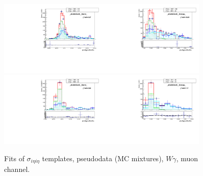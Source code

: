 \begin{figure}[htb]
\begin{center}
   \includegraphics[width=0.45\textwidth]{../figs/figs_v11/MUON_WGamma/TemplateFits/c_TEMPL_SIHIH_UNblind__phoEt25to30__Barrel__RooFit_MCclosure.pdf}\includegraphics[width=0.45\textwidth]{../figs/figs_v11/MUON_WGamma/TemplateFits/c_TEMPL_SIHIH_UNblind__phoEt25to30__Endcap__RooFit_MCclosure.pdf}\\
   \includegraphics[width=0.45\textwidth]{../figs/figs_v11/MUON_WGamma/TemplateFits/c_TEMPL_SIHIH_UNblind__phoEt30to35__Barrel__RooFit_MCclosure.pdf}\includegraphics[width=0.45\textwidth]{../figs/figs_v11/MUON_WGamma/TemplateFits/c_TEMPL_SIHIH_UNblind__phoEt30to35__Endcap__RooFit_MCclosure.pdf}\\
  \label{fig:templateFits_MCclosure_SIHIH_MUON_1}
  \caption{Fits of $\sigma_{i \eta i \eta}$ templates, pseudodata (MC mixtures), $W\gamma$, muon channel.}
  \end{center}
\end{figure}

